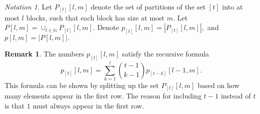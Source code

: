 \documentclass[10 pt]{amsart}
\theoremstyle{plain}
\theoremstyle{definition}
\newtheorem{rem}[thm]{Remark}
\theoremstyle{remark}
\newtheorem{note}[thm]{Notation}
\numberwithin{equation}{section}
\newcommand\BN{{\mathbb N}}
\begin{document}
\begin{note}
Let $P_{[t]}[l,m]$ denote the set of partitions of the set $[t]$ into at most $l$ blocks, such that each block has size at most $m.$ Let $P[l,m] = \cup_{t \in \BN} P_{[t]}[l,m].$ Denote $p_{[t]}[l,m] = |P_{[t]}[l,m]|,$ and $p[l,m] = |P[l,m]|.$
\end{note}

\begin{rem}
The numbers $p_{[t]}[l,m]$ satisfy the recursive formula
$$p_{[t]}[l,m] = \sum_{k=1}^l \binom {t-1} {k-1} p_{[t-k]}[l-1,m].$$
This formula can be shown by splitting up the set $P_{[t]}[l,m]$ based on how many elements appear in the first row. The reason for including $t-1$ instead of $t$ is that $1$ must always appear in the first row.
\end{rem}
\end{document}

